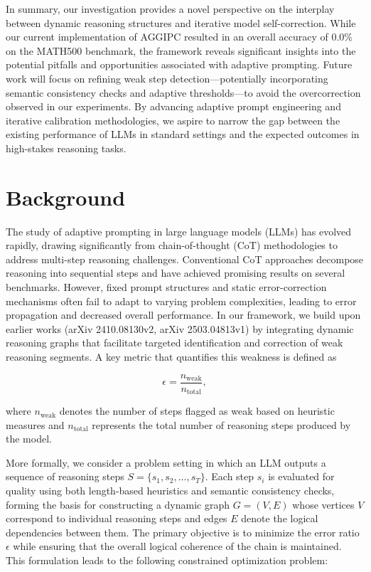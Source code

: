 \documentclass[11pt]{article}
\begin{document}
In summary, our investigation provides a novel perspective on the interplay between dynamic reasoning structures and iterative model self-correction. While our current implementation of AGGIPC resulted in an overall accuracy of 0.0\% on the MATH500 benchmark, the framework reveals significant insights into the potential pitfalls and opportunities associated with adaptive prompting. Future work will focus on refining weak step detection—potentially incorporating semantic consistency checks and adaptive thresholds—to avoid the overcorrection observed in our experiments. By advancing adaptive prompt engineering and iterative calibration methodologies, we aspire to narrow the gap between the existing performance of LLMs in standard settings and the expected outcomes in high-stakes reasoning tasks.

\section{Background}
The study of adaptive prompting in large language models (LLMs) has evolved rapidly, drawing significantly from chain-of-thought (CoT) methodologies to address multi-step reasoning challenges. Conventional CoT approaches decompose reasoning into sequential steps and have achieved promising results on several benchmarks. However, fixed prompt structures and static error-correction mechanisms often fail to adapt to varying problem complexities, leading to error propagation and decreased overall performance. In our framework, we build upon earlier works (arXiv 2410.08130v2, arXiv 2503.04813v1) by integrating dynamic reasoning graphs that facilitate targeted identification and correction of weak reasoning segments. A key metric that quantifies this weakness is defined as

\[
\epsilon = \frac{n_{\text{weak}}}{n_{\text{total}}},
\]

where \(n_{\text{weak}}\) denotes the number of steps flagged as weak based on heuristic measures and \(n_{\text{total}}\) represents the total number of reasoning steps produced by the model.

More formally, we consider a problem setting in which an LLM outputs a sequence of reasoning steps \(S = \{s_1, s_2, \dots, s_T\}\). Each step \(s_i\) is evaluated for quality using both length-based heuristics and semantic consistency checks, forming the basis for constructing a dynamic graph \(G = (V, E)\) whose vertices \(V\) correspond to individual reasoning steps and edges \(E\) denote the logical dependencies between them. The primary objective is to minimize the error ratio \(\epsilon\) while ensuring that the overall logical coherence of the chain is maintained. This formulation leads to the following constrained optimization problem:
\end{document}
